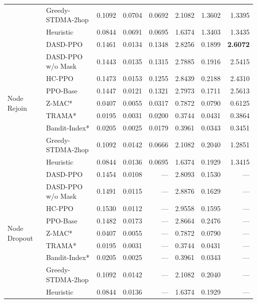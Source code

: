 \begin{table}[!htbp]
{\begin{tabular}{@{}llrrrrrr@{}}
  & Greedy-STDMA-2hop   & 0.1092 & 0.0704 & 0.0692 & 2.1082 & 1.3602 & 1.3395 \\
  & Heuristic           & 0.0844 & 0.0691 & 0.0695 & 1.6374 & 1.3403 & 1.3435 \\
\midrule
\multirow{9}{*}{Node Rejoin}
  & DASD-PPO            & 0.1461 & 0.0134 & 0.1348 & 2.8256 & 0.1899 & \textbf{2.6072} \\
  & DASD-PPO w/o Mask   & 0.1443 & 0.0135 & 0.1315 & 2.7885 & 0.1916 & 2.5415 \\
  & HC-PPO              & 0.1473 & 0.0153 & 0.1255 & 2.8439 & 0.2188 & 2.4310 \\
  & PPO-Base            & 0.1447 & 0.0121 & 0.1321 & 2.7973 & 0.1711 & 2.5613 \\
  & Z-MAC*              & 0.0407 & 0.0055 & 0.0317 & 0.7872 & 0.0790 & 0.6125 \\
  & TRAMA*              & 0.0195 & 0.0031 & 0.0200 & 0.3744 & 0.0431 & 0.3864 \\
  & Bandit-Index*       & 0.0205 & 0.0025 & 0.0179 & 0.3961 & 0.0343 & 0.3451 \\
  & Greedy-STDMA-2hop   & 0.1092 & 0.0142 & 0.0666 & 2.1082 & 0.2040 & 1.2851 \\
  & Heuristic           & 0.0844 & 0.0136 & 0.0695 & 1.6374 & 0.1929 & 1.3415 \\
\midrule
\multirow{9}{*}{Node Dropout}
  & DASD-PPO            & 0.1454 & 0.0108 & ---    & 2.8093 & 0.1530 & --- \\
  & DASD-PPO w/o Mask   & 0.1491 & 0.0115 & ---    & 2.8876 & 0.1629 & --- \\
  & HC-PPO              & 0.1530 & 0.0112 & ---    & 2.9558 & 0.1595 & --- \\
  & PPO-Base            & 0.1482 & 0.0173 & ---    & 2.8664 & 0.2476 & --- \\
  & Z-MAC*              & 0.0407 & 0.0055 & ---    & 0.7872 & 0.0790 & --- \\
  & TRAMA*              & 0.0195 & 0.0031 & ---    & 0.3744 & 0.0431 & --- \\
  & Bandit-Index*       & 0.0205 & 0.0025 & ---    & 0.3961 & 0.0343 & --- \\
  & Greedy-STDMA-2hop   & 0.1092 & 0.0142 & ---    & 2.1082 & 0.2040 & --- \\
  & Heuristic           & 0.0844 & 0.0136 & ---    & 1.6374 & 0.1929 & --- \\
\bottomrule
\end{tabular}%
}
\end{table}

